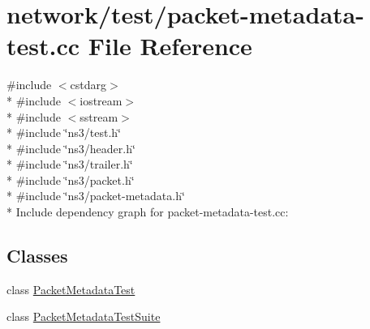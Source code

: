 \hypertarget{packet-metadata-test_8cc}{}\section{network/test/packet-\/metadata-\/test.cc File Reference}
\label{packet-metadata-test_8cc}
{\ttfamily \#include $<$cstdarg$>$}\\*
{\ttfamily \#include $<$iostream$>$}\\*
{\ttfamily \#include $<$sstream$>$}\\*
{\ttfamily \#include \char`\"{}ns3/test.\+h\char`\"{}}\\*
{\ttfamily \#include \char`\"{}ns3/header.\+h\char`\"{}}\\*
{\ttfamily \#include \char`\"{}ns3/trailer.\+h\char`\"{}}\\*
{\ttfamily \#include \char`\"{}ns3/packet.\+h\char`\"{}}\\*
{\ttfamily \#include \char`\"{}ns3/packet-\/metadata.\+h\char`\"{}}\\*
Include dependency graph for packet-\/metadata-\/test.cc\+:
\subsection*{Classes}
\begin{DoxyCompactItemize}
\item 
class \hyperlink{classPacketMetadataTest}{Packet\+Metadata\+Test}
\item 
class \hyperlink{classPacketMetadataTestSuite}{Packet\+Metadata\+Test\+Suite}
\end{DoxyCompactItemize}
